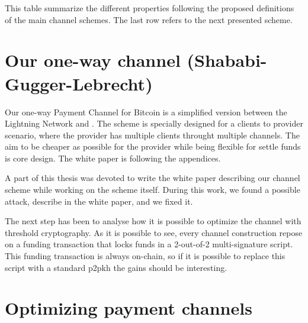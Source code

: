 This table summarize the different properties following the proposed definitions
of the main channel schemes. The last row refers to the next presented scheme.

\section{Our one-way channel (Shababi-Gugger-Lebrecht)}

Our one-way Payment Channel for Bitcoin is a simplified version between the Lightning
Network and  \cite{poon2016bitcoin, YoursLightningProtocol}.
The scheme is specially designed for a clients to provider scenario, where the provider
has multiple clients throught multiple channels. The aim to be cheaper as possible for
the provider while being flexible for settle funds is core design. The white paper is following the
appendices.

A part of this thesis was devoted to write the white paper describing our channel scheme
while working on the scheme itself. During this work, we found a possible attack, describe
in the white paper, and we fixed it.

The next step has been to analyse how it is possible to optimize the channel with
threshold cryptography. As it is possible to see, every channel construction repose
on a funding transaction that locks funds in a 2-out-of-2 multi-signature script.
This funding transaction is always on-chain, so if it is possible to replace this
script with a standard \gls{p2pkh} the gains should be interesting.

\section{Optimizing payment channels}

